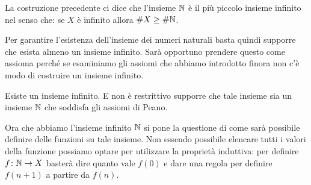 La costruzione precedente ci dice che l'insieme ${\mathbb N}$ è il più piccolo insieme infinito
nel senso che: se $X$ è infinito allora $\# X \ge \# {\mathbb N}$. 

Per garantire l'esistenza dell'insieme dei numeri naturali basta quindi 
supporre che esista almeno un insieme infinito.
Sarà opportuno prendere questo come assioma perché se esaminiamo 
gli assiomi che abbiamo introdotto finora 
non c'è modo di costruire un insieme infinito.

\begin{axiom}[infinito]
\label{axiom:infinito}%
Esiste un insieme infinito. 
E non è restrittivo supporre che tale insieme sia un insieme ${\mathbb N}$ 
che soddisfa gli assiomi di Peano. 
\end{axiom}

  
Ora che abbiamo l'insieme infinito ${\mathbb N}$ si pone la questione di come sarà possibile definire
delle funzioni su tale insieme. 
Non essendo possibile elencare tutti i valori della funzione possiamo optare 
per utilizzare la proprietà induttiva: per definire $f\colon {\mathbb N} \to X$ 
basterà dire quanto vale $f(0)$ e dare una regola per definire $f(n+1)$ a partire da $f(n)$.

